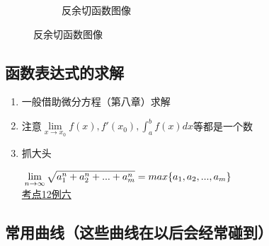 \begin{enumerate}
\begin{enumerate}
\begin{enumerate}
\begin{figure}[H]
\begin{subfigure}{.475\linewidth}
            \end{subfigure}
            \begin{subfigure}{.475\linewidth}
            \caption{反余切函数图像}
            \end{subfigure}
            \end{figure}
            \end{enumerate}
    \end{enumerate}


\end{enumerate}

\subsection{函数表达式的求解}

\begin{enumerate}
    \item 一般借助微分方程（第八章）求解
    \item 注意$\lim \limits_{x\to x_0}f(x),f'(x_0),\int_{a}^{b}f(x)dx$等都是一个数
    \item 抓大头
    \begin{tcolorbox}
        \newline
        $\displaystyle\hspace{.2em}\lim \limits_{n\to \infty}\sqrt{a_1^n+a_2^n+...+a_m^n}=max\{a_1,a_2,...,a_m\}$\\
        \hyperref[考点12例六]{考点12例六}
    \end{tcolorbox}

\end{enumerate}

\subsection{常用曲线（这些曲线在以后会经常碰到）}

